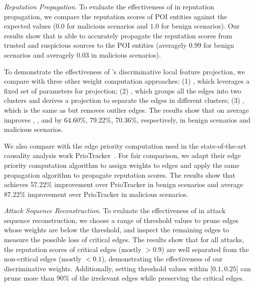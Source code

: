 \emph{Reputation Propagation}.
To evaluate the effectiveness of \tool in reputation propagation, we compare the reputation scores of POI entities against the expected values ($0.0$ for malicious scenarios and $1.0$ for benign scenarios).
Our results show that \tool is able to accurately propagate the reputation scores from trusted and suspicious sources to the POI entities (averagely $0.99$ for benign scenarios and averagely $0.03$ in malicious scenarios).

To demonstrate the effectiveness of \tool's discriminative local feature projection, we compare \tool with three other weight computation approaches:
(1) \lpfixed, which leverages a fixed set of parameters for projection;
(2) \lpglobal, which groups all the edges into two clusters and derives a projection to separate the edges in different clusters;
(3) \lpglobalplus, which is the same as \lpglobal but removes outlier edges. 
The results show that \tool on average improves \lpfixed, \lpglobal, and \lpglobalplus by 64.60\%, 79.22\%, 70.36\%, respectively, in benign scenarios and malicious scenarios.


We also compare \tool with the edge priority computation used in the state-of-the-art causality analysis work  PrioTracker~\cite{liu2018priotracker}. For fair comparison, we adapt their edge priority computation algorithm to assign weights to edges and apply the same propagation algorithm to propagate reputation scores. 
The results show that \tool achieves 57.22\% improvement over PrioTracker in benign scenarios and average 87.22\% improvement over PrioTracker in malicious scenarios. 

\emph{Attack Sequence Reconstruction}.
To evaluate the effectiveness of \tool in attack sequence reconstruction, 
we choose a range of threshold values to prune edges whose weights are below the threshold, and inspect the remaining edges to measure the possible loss of critical edges.
The results show that for all attacks, the reputation scores of critical edges (mostly $>0.9$) are well separated from the non-critical edges (mostly $<0.1$),
demonstrating the effectiveness of our discriminative weights. 
Additionally, setting threshold values within $\lbrack 0.1,0.25 \rbrack$ can prune more than 90\% of the irrelevant edges while preserving the critical edges.










